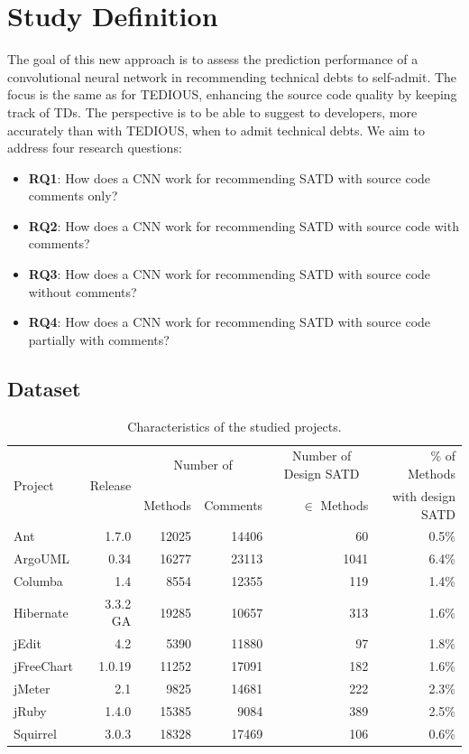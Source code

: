 \section{Study Definition}


The goal of this new approach is to assess the prediction performance of a convolutional neural network in recommending technical debts to self-admit. The focus is the same as for TEDIOUS, enhancing the source code quality by keeping track of TDs. The perspective is to be able to suggest to developers, more accurately than with TEDIOUS, when to admit technical debts. We aim to address four research questions:

\begin{itemize}
	\item \textbf{RQ1}: How does a CNN work for recommending SATD with source code comments only?
	\item \textbf{RQ2}: How does a CNN work for recommending SATD with source code  with comments?
	\item \textbf{RQ3}: How does a CNN work for recommending SATD with source code without comments?
	\item \textbf{RQ4}: How does a CNN work for recommending SATD with source code partially with comments?
\end{itemize}

\subsection{Dataset}


	\begin{table}[t]
		\caption{Characteristics of the studied projects.}
		\label{tab:projectsCNN}
		\centering
		\begin{adjustbox}{center}
			\begin{tabular}{l r | r r | r | r}
				\hline
				\multirow{2}{*}{Project} & \multirow{2}{*}{Release} &\multicolumn{2}{c|}{Number of} 
				&\multicolumn{1}{c|}{Number of Design SATD} & \% of Methods\\
				&&  Methods& Comments & $\in$ Methods & with design SATD\\
				\hline
				Ant&1.7.0 & 12025 & 14406& 60& 0.5\% \\
				ArgoUML&0.34& 16277 & 23113 & 1041& 6.4\%\\
				Columba&1.4& 8554 & 12355 &119 & 1.4\%  \\
				Hibernate&3.3.2 GA & 19285 & 10657 &313 & 1.6\%\\
				jEdit & 4.2 & 5390 & 11880 &97 & 1.8\% \\
				jFreeChart&1.0.19 & 11252 & 17091& 182& 1.6\%\\
				jMeter&2.1& 9825 & 14681 &222 & 2.3\%  \\
				jRuby&1.4.0 & 15385 & 9084 &389 &2.5\%\\
				Squirrel&3.0.3 & 18328 & 17469 &106 & 0.6\%\\
				\hline
			\end{tabular}
		\end{adjustbox}
		\vspace{-4mm}
	\end{table}

